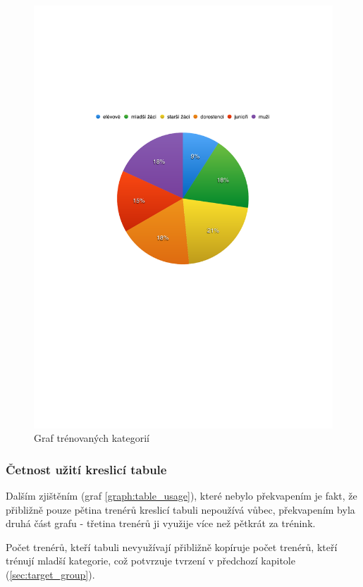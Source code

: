 \documentclass[thesis=B,czech]{FITthesis}[2012/06/26]
\begin{document}
	\begin{figure}
		\includegraphics{img/graph_category}
		\caption{Graf trénovaných kategorií}\label{graph:category}
	\end{figure}

\subsubsection{Četnost užití kreslicí tabule}

	Dalším zjištěním (graf \ref{graph:table_usage}), které nebylo překvapením je fakt, že přibližně pouze pětina trenérů kreslicí tabuli nepoužívá vůbec, překvapením byla druhá část grafu \-- třetina trenérů ji využije více než pětkrát za trénink.

	Počet trenérů, kteří tabuli nevyužívají přibližně kopíruje počet trenérů, kteří trénují mladší kategorie, což potvrzuje tvrzení v předchozí kapitole (\ref{sec:target_group}).
\end{document}
